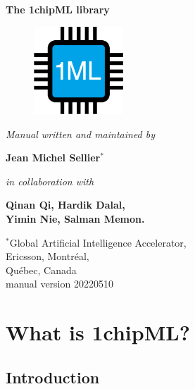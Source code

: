 \documentclass{book}
\begin{document}
\begin{titlepage}
\begin{center}

\begin{spacing}{2.5}
\textbf{\huge The 1chipML library}\\[0.5cm]

\begin{figure}[h]
\centering
\includegraphics[width=0.3\textwidth]{1chipML_logo.eps}
\end{figure}

\vspace*{\fill}
\textit{Manual written and maintained by}
\end{spacing}

\begin{spacing}{1.15}
\textbf{\large Jean Michel Sellier$^*$}
\vspace*{\fill}
\end{spacing}

\begin{spacing}{1.15}
\textit{\large in collaboration with}

\textbf{Qinan Qi, Hardik Dalal,\\Yimin Nie, Salman Memon.}

\vspace*{\fill}

\textnormal{\large $^*$Global Artificial Intelligence Accelerator,\\ Ericsson, Montr\'{e}al,\\Qu\'{e}bec, Canada\\ \bigskip manual version 20220510}

\end{spacing}
\end{center}
\end{titlepage}

\tableofcontents

\chapter{What is 1chipML?}

\section{Introduction}
\end{document}
